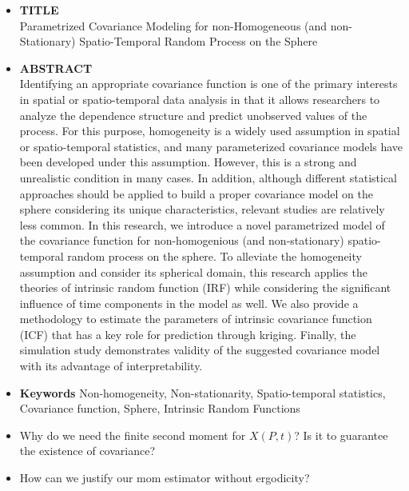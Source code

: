 \documentclass[11pt]{article}
\begin{document}
\begin{itemize}
\pagebreak

\item \textbf{TITLE}\\
Parametrized Covariance Modeling for non-Homogeneous (and non-Stationary) Spatio-Temporal Random Process on the
Sphere\\

\item \textbf{ABSTRACT}\\
Identifying an appropriate covariance function is one of the primary interests in spatial or spatio-temporal data analysis in that it allows researchers to analyze the dependence structure and predict unobserved values of the process. For this purpose, homogeneity is a widely used assumption in spatial or spatio-temporal statistics, and many parameterized covariance models have been developed under this assumption. However, this is a strong and unrealistic condition in many cases. In addition, although different statistical approaches should be applied to build a proper covariance model on the sphere considering its unique characteristics, relevant studies are relatively less common. In this research, we introduce a novel parametrized model of the covariance function for non-homogenious (and non-stationary) spatio-temporal random process on the sphere. To alleviate the homogeneity assumption and consider its spherical domain, this research applies the theories of intrinsic random function (IRF) while considering the significant influence of time components in the model as well. We also provide a methodology to estimate the parameters of intrinsic covariance function (ICF) that has a key role for prediction through kriging. Finally, the simulation study demonstrates validity of the suggested covariance model with its advantage of interpretability.\\

\item
\textbf{Keywords } Non-homogeneity, Non-stationarity, Spatio-temporal statistics, Covariance function, Sphere, Intrinsic Random Functions\\

\pagebreak

\item Why do we need the finite second moment for $X(P,t)$? Is it to guarantee the existence of covariance?\\

\item How can we justify our mom estimator without ergodicity?\\


\end{itemize}
\end{document}
